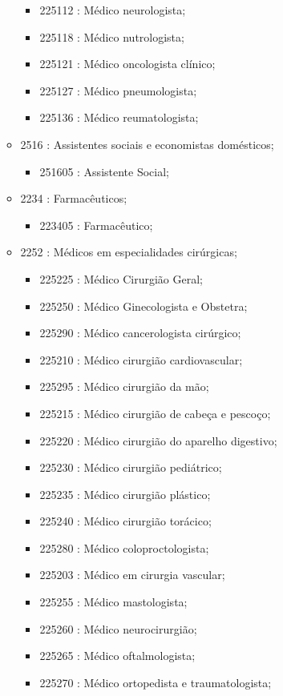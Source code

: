 \begin{itemize}
\begin{itemize}
\begin{itemize}
      \item 225112 : Médico neurologista;
      \item 225118 : Médico nutrologista;
      \item 225121 : Médico oncologista clínico;
      \item 225127 : Médico pneumologista;
      \item 225136 : Médico reumatologista;
    \end{itemize}
    \item 2516 : Assistentes sociais e economistas domésticos;
    \begin{itemize}
      \item 251605 : Assistente Social;
    \end{itemize}
    \item 2234 : Farmacêuticos;
    \begin{itemize}
      \item 223405 : Farmacêutico;
    \end{itemize}
    \item 2252 : Médicos em especialidades cirúrgicas;
    \begin{itemize}
      \item 225225 : Médico Cirurgião Geral;
      \item 225250 : Médico Ginecologista e Obstetra;
      \item 225290 : Médico cancerologista cirúrgico;
      \item 225210 : Médico cirurgião cardiovascular;
      \item 225295 : Médico cirurgião da mão;
      \item 225215 : Médico cirurgião de cabeça e pescoço;
      \item 225220 : Médico cirurgião do aparelho digestivo;
      \item 225230 : Médico cirurgião pediátrico;
      \item 225235 : Médico cirurgião plástico;
      \item 225240 : Médico cirurgião torácico;
      \item 225280 : Médico coloproctologista;
      \item 225203 : Médico em cirurgia vascular;
      \item 225255 : Médico mastologista;
      \item 225260 : Médico neurocirurgião;
      \item 225265 : Médico oftalmologista;
      \item 225270 : Médico ortopedista e traumatologista;

\end{itemize}
\end{itemize}
\end{itemize}
